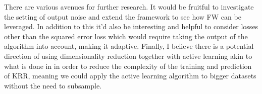 There are various avenues for further research. It would be fruitful to
investigate the setting of output noise and extend the framework to see how FW
can be leveraged. In addition to this it'd also be interesting and helpful to
consider losses other than the squared error loss which would require taking the
output of the algorithm into account, making it adaptive. Finally, I believe
there is a potential direction of using dimensionality reduction together with
active learning akin to what is done in \cite{rudi18} in order to reduce the
complexity of the training and prediction of KRR, meaning we could apply the
active learning algorithm to bigger datasets without the need to subsample.

